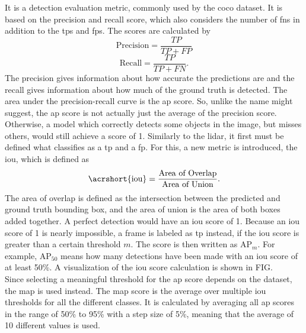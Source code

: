 It is a detection evaluation metric, commonly used by the \gls{coco} dataset.
It is based on the precision and recall score, which also considers the number of \glspl{fn} in addition to the \glspl{tp} and \glspl{fp}.
The scores are calculated by
\begin{equation}
	\text{Precision} = \frac{TP}{TP+FP}
\end{equation}
\begin{equation}
	\text{Recall} = \frac{TP}{TP+FN}.
\end{equation}
The precision gives information about how accurate the predictions are and the recall gives information about how much of the ground truth is detected.
The area under the precision-recall curve is the \gls{ap} score.
So, unlike the name might suggest, the \gls{ap} score is not actually just the average of the precision score.
Otherwise, a model which correctly detects some objects in the image, but misses others, would still achieve a score of 1.
Similarly to the \gls{lidar}, it first must be defined what classifies as a \gls{tp} and a \gls{fp}.
For this, a new metric is introduced, the \gls{iou}, which is defined as
\begin{equation}
	\text{\acrshort{iou}} = \frac{\text{Area of Overlap}}{\text{Area of Union}}.
\end{equation}
The area of overlap is defined as the intersection between the predicted and ground truth bounding box, and the area of union is the area of both boxes added together.
A perfect detection would have an \gls{iou} score of 1.
Because an \gls{iou} score of 1 is nearly impossible, a frame is labeled as \gls{tp} instead, if the \gls{iou} score is greater than a certain threshold $m$.
The score is then written as $\text{AP}_{m}$.
For example, $\text{AP}_{50}$ means how many detections have been made with an \gls{iou} score of at least 50\%.
A visualization of the \gls{iou} score calculation is shown in FIG.\\
Since selecting a meaningful threshold for the \gls{ap} score depends on the dataset, the \gls{map} is used instead.
The \gls{map} score is the average over multiple \gls{iou} thresholds for all the different classes.
It is calculated by averaging all \gls{ap} scores in the range of 50\% to 95\% with a step size of 5\%, meaning that the average of 10 different values is used.\\

\section{}

